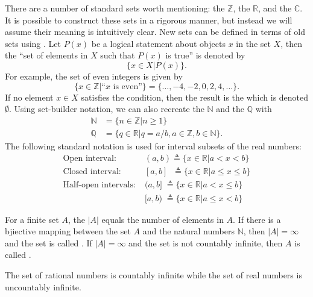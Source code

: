 There are a number of standard sets worth mentioning: the  $\mathbb{Z}$, the  $\mathbb{R}$, and the  $\mathbb{C}$.
It is possible to construct these sets in a rigorous manner, but instead we will assume their meaning is intuitively clear.
New sets can be defined in terms of old sets using .
Let $P(x)$ be a logical statement about objects $x$ in the set $X$, then the ``set of elements in $X$ such that $P(x)$ is true'' is denoted by
\[ \{ x\in X | P(x) \}. \]
For example, the set of even integers is given by
\[ \{ x\in \mathbb{Z} | \textrm{``}x\textrm{ is even''} \} = \{ \ldots,-4,-2,0,2,4,\ldots \}. \]
If no element $x\in X$ satisfies the condition, then the result is the  which is denoted $\emptyset$.
Using set-builder notation, we can also recreate the  $\mathbb{N}$ and the  $\mathbb{Q}$ with
\begin{align*}
\mathbb{N} & = \{ n\in \mathbb{Z} | n\geq 1 \} \\
\mathbb{Q} & = \{ q\in \mathbb{R} | q=a/b, a\in \mathbb{Z}, b\in \mathbb{N} \}.
\end{align*}
The following standard notation is used for interval subsets of the real numbers:
\begin{align*}
\textrm{Open interval:} \; &  (a,b) \triangleq \{ x\in \mathbb{R} | a<x<b \} \\
\textrm{Closed interval:} \; & [a,b] \;\;\!\! \triangleq \{ x\in \mathbb{R} | a \leq x \leq b \} \\
\textrm{Half-open intervals:} \; & (a,b] \;\! \triangleq \{ x\in \mathbb{R} | a < x \leq b \} \\
& [a,b) \;\! \triangleq \{ x\in \mathbb{R} | a \leq x < b \}
\end{align*}

\begin{definition}
For a finite set $A$, the  $|A|$ equals the number of elements in $A$.
If there is a bjiective mapping between the set $A$ and the natural numbers $\mathbb{N}$, then $|A| = \infty$ and the set is called .
If $|A| = \infty$ and the set is not countably infinite, then $A$ is called .
\end{definition}

\begin{example}
The set of rational numbers is countably infinite while the set of real numbers is uncountably infinite.
\end{example}

